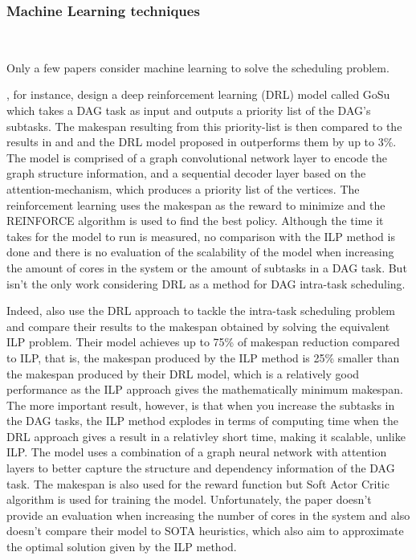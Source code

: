 \subsubsection{Machine Learning techniques}
~

Only a few papers consider machine learning 
to solve the scheduling problem.

\citet{Lee2021GlobalDagSchedDRL}, for instance,
design a deep reinforcement learning (DRL) model called GoSu 
which takes a DAG task as input and outputs 
a priority list of the DAG's subtasks.
The makespan resulting from this priority-list is 
then compared to the results in \cite{Zhao2022DAGsched} and \cite{He2019DagIntra}
and the DRL model proposed in \cite{Lee2021GlobalDagSchedDRL}
outperforms them by up to 3\%.
The model is comprised of a graph convolutional network 
layer to encode the graph structure information,
and a sequential decoder layer based on the attention-mechanism,
which produces a priority list of the vertices.
The reinforcement learning uses the makespan as the reward to minimize
and the REINFORCE algorithm is used to find the best policy.
Although the time it takes for the model to run is measured,
no comparison with the ILP method is done and 
there is no evaluation of the scalability of the model 
when increasing the amount of cores in the system or the amount of subtasks in a DAG task.
But \citet{Lee2021GlobalDagSchedDRL} isn't the only work considering 
DRL as a method for DAG intra-task scheduling.

Indeed, \citet{Zhao2024GATDRLmodel} also 
use the DRL approach to tackle the intra-task scheduling 
problem and compare their results to the makespan
obtained by solving the equivalent ILP problem.
Their model achieves up to 75\% of makespan 
reduction compared to ILP, that is, the makespan 
produced by the ILP method is 25\% smaller than the 
makespan produced by their DRL model,
which is a relatively good performance as 
the ILP approach gives the mathematically minimum makespan.
The more important result, however,
is that when you increase the subtasks in the DAG tasks,
the ILP method explodes in terms of computing
time when the DRL approach gives a result in a relativley short time,
making it scalable, unlike ILP.
The model uses a combination of a graph neural network 
with attention layers to better capture 
the structure and dependency information of the DAG task.
The makespan is also used for the reward function but 
Soft Actor Critic algorithm is used for training the model. 
Unfortunately, the paper doesn't provide 
an evaluation when increasing the number of cores 
in the system and also doesn't compare their model 
to SOTA heuristics, which also aim to approximate 
the optimal solution given by the ILP method.

